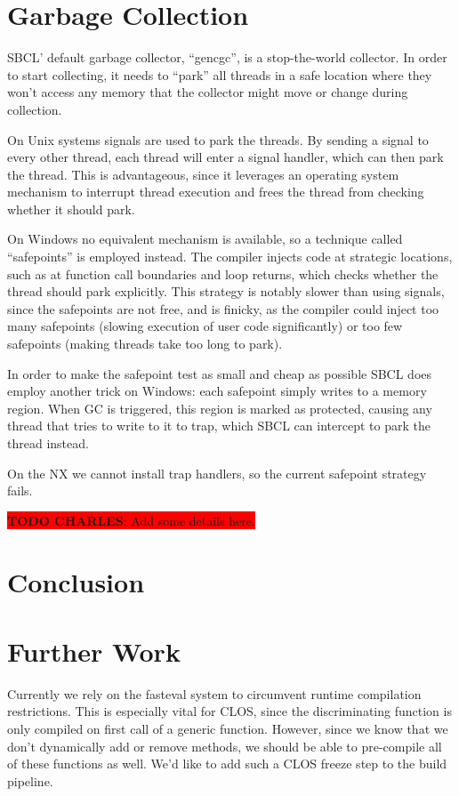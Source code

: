 \documentclass[format=sigconf]{acmart}
\begin{document}
\section{Garbage Collection}\label{gc}
SBCL' default garbage collector, ``gencgc'', is a stop-the-world collector. In order to start collecting, it needs to ``park'' all threads in a safe location where they won't access any memory that the collector might move or change during collection.

On Unix systems signals are used to park the threads. By sending a signal to every other thread, each thread will enter a signal handler, which can then park the thread. This is advantageous, since it leverages an operating system mechanism to interrupt thread execution and frees the thread from checking whether it should park.

On Windows no equivalent mechanism is available, so a technique called ``safepoints'' is employed instead. The compiler injects code at strategic locations, such as at function call boundaries and loop returns, which checks whether the thread should park explicitly. This strategy is notably slower than using signals, since the safepoints are not free, and is finicky, as the compiler could inject too many safepoints (slowing execution of user code significantly) or too few safepoints (making threads take too long to park).

In order to make the safepoint test as small and cheap as possible SBCL does employ another trick on Windows: each safepoint simply writes to a memory region. When GC is triggered, this region is marked as protected, causing any thread that tries to write to it to trap, which SBCL can intercept to park the thread instead.

On the NX we cannot install trap handlers, so the current safepoint strategy fails.

\colorbox{red}{
  \textbf{TODO CHARLES}: Add some details here.
}

\section{Conclusion}\label{conclusion}


\section{Further Work}\label{further-work}
Currently we rely on the fasteval system to circumvent runtime compilation restrictions. This is especially vital for CLOS, since the discriminating function is only compiled on first call of a generic function. However, since we know that we don't dynamically add or remove methods, we should be able to pre-compile all of these functions as well. We'd like to add such a CLOS freeze step to the build pipeline.
\end{document}
